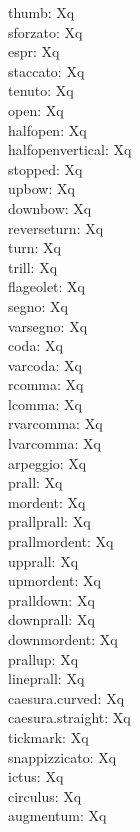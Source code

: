\documentclass{scrartcl}
\begin{document}
\noindent thumb:  Xq\\
sforzato:  Xq\\
espr:  Xq\\
staccato:  Xq\\
tenuto:  Xq\\
open:  Xq\\
halfopen:  Xq\\
halfopenvertical:  Xq\\
stopped:  Xq\\
upbow:  Xq\\
downbow:  Xq\\
reverseturn:  Xq\\
turn:  Xq\\
trill:  Xq\\
flageolet:  Xq\\
segno:  Xq\\
varsegno:  Xq\\
coda:  Xq\\
varcoda:  Xq\\
rcomma:  Xq\\
lcomma:  Xq\\
rvarcomma:  Xq\\
lvarcomma:  Xq\\
arpeggio:  Xq\\
prall:  Xq\\
mordent:  Xq\\
prallprall:  Xq\\
prallmordent:  Xq\\
upprall:  Xq\\
upmordent:  Xq\\
pralldown:  Xq\\
downprall:  Xq\\
downmordent:  Xq\\
prallup:  Xq\\
lineprall:  Xq\\
caesura.curved:  Xq\\
caesura.straight:  Xq\\
tickmark:  Xq\\
snappizzicato:  Xq\\
ictus:  Xq\\
circulus:  Xq\\
augmentum:  Xq\\
\end{document}
